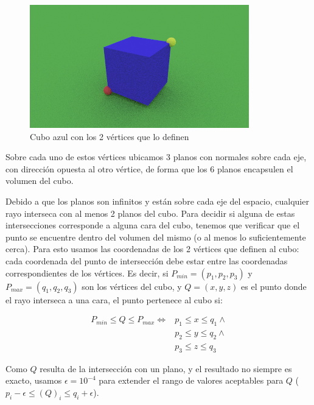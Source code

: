 \begin{figure}[H]
  \centering
  \includegraphics[width=.7\textwidth]{imgs/box-vertices.png}
  \caption{Cubo azul con los 2 vértices que lo definen}
  \label{fig:box-vertices}
\end{figure}

Sobre cada uno de estos vértices ubicamos 3 planos con normales sobre cada eje,
con dirección opuesta al otro vértice, de forma que los 6 planos encapsulen el
volumen del cubo.

Debido a que los planos son infinitos y están sobre cada eje del espacio,
cualquier rayo interseca con al menos 2 planos del cubo. Para decidir si alguna
de estas intersecciones corresponde a alguna cara del cubo, tenemos que
verificar que el punto se encuentre dentro del volumen del mismo (o al menos lo
suficientemente cerca). Para esto usamos las coordenadas de los 2 vértices que
definen al cubo: cada coordenada del punto de intersección debe estar entre las
coordenadas correspondientes de los vértices. Es decir, si $P_{min}=(p_1, p_2,
  p_3)$ y $P_{max}=(q_1, q_2, q_3)$ son los vértices del cubo, y $Q=(x, y, z)$ es
el punto donde el rayo interseca a una cara, el punto pertenece al cubo si:

\begin{align*}
  P_{min} \le Q \le P_{max} \iff & p_1 \le x \le q_1 \land \\
                                 & p_2 \le y \le q_2 \land \\
                                 & p_3 \le z \le q_3
\end{align*}

Como $Q$ resulta de la intersección con un plano, y el resultado no siempre es
exacto, usamos $\epsilon = 10^{-4}$ para extender el rango de valores aceptables
para $Q$ ($p_i - \epsilon \le (Q)_i \le q_i + \epsilon$).

